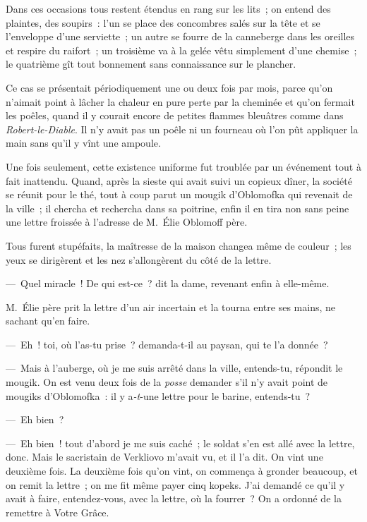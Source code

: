 \documentclass[french,twoside]{book} %
\begin{document}
Dans ces occasions tous restent étendus en rang sur les lits ; on entend des plaintes, des soupirs : l’un se place des concombres salés sur la tête et se l’enveloppe d’une serviette ; un autre se fourre de la canneberge dans les oreilles et respire du raifort ; un troisième va à la gelée vêtu simplement d’une chemise ; le quatrième gît tout bonnement sans connaissance sur le plancher.\par
Ce cas se présentait périodiquement une ou deux fois par mois, parce qu’on n’aimait point à lâcher la chaleur en pure perte par la cheminée et qu’on fermait les poêles, quand il y courait encore de petites flammes bleuâtres comme dans \emph{Robert-le-Diable}. Il n’y avait pas un poêle ni un fourneau où l’on pût appliquer la main sans qu’il y vînt une ampoule.\par
Une fois seulement, cette existence uniforme fut troublée par un événement tout à fait inattendu. Quand, après la sieste qui avait suivi un copieux dîner, la société se réunit pour le thé, tout à coup parut un mougik d’Oblomofka qui revenait de la ville ; il chercha et rechercha dans sa poitrine, enfin il en tira non sans peine une lettre froissée à l’adresse de M. Élie Oblomoff père.\par
Tous furent stupéfaits, la maîtresse de la maison changea même de couleur ; les yeux se dirigèrent et les nez s’allongèrent du côté de la lettre.\par
— Quel miracle ! De qui est-ce ? dit la dame, revenant enfin à elle-même.\par
M. Élie père prit la lettre d’un air incertain et la tourna entre ses mains, ne sachant qu’en faire.\par
— Eh ! toi, où l’as-tu prise ? demanda-t-il au paysan, qui te l’a donnée ?\par
— Mais à l’auberge, où je me suis arrêté dans la ville, entends-tu, répondit le mougik. On est venu deux fois de la \emph{posse} demander s’il n’y avait point de mougiks d’Oblomofka : il y a\emph{-t}-une lettre pour le barine, entends-tu ?\par
— Eh bien ?\par
— Eh bien ! tout d’abord je me suis caché ; le soldat s’en est allé avec la lettre, donc. Mais le sacristain de Verkliovo m’avait vu, et il l’a dit. On vint une deuxième fois. La deuxième fois qu’on vint, on commença à gronder beaucoup, et on remit la lettre ; on me fit même payer cinq kopeks. J’ai demandé ce qu’il y avait à faire, entendez-vous, avec la lettre, où la fourrer ? On a ordonné de la remettre à Votre Grâce.\par
\end{document}
